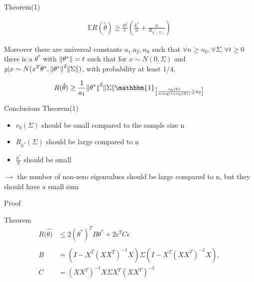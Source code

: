 \documentclass{beamer}
\begin{document}
\begin{frame}{Theorem(1)}

\begin{align*}
	\mathbb{E}R(\hat{\theta}) \geq \frac{\sigma^2}{c} \left(\frac{k^*}{n} + \frac{n}{R_{k^*(\Sigma)}}\right)
\end{align*}


Moreover there are universal constants $a_1.a_2,n_0$ such that $\forall n \geq n_0, \forall \Sigma, \forall t \geq 0$ there is a $\theta^*$ with $\norm{\theta^*} = t$ such that for $x \sim N(0,\Sigma)$ and $y|x \sim N(x^T\theta^*,\norm{\theta^*}^2\norm{\Sigma})$, with probability at least $1/4$,
	

\begin{align*}
	R(\hat{\theta})\geq \frac{1}{a_1}\norm{\theta^*}^2\norm{\Sigma}\mathbbm{1}_{\left[\frac{r_0(\Sigma)}{n\log(1+r_0(\Sigma))} \geq a_2\right]}
\end{align*}

\end{frame}

\begin{frame}{Conclusions Theorem(1)}
\begin{itemize}
\item $r_0(\Sigma)$ should be small compared to the sample size n
\item $R_{k^*}(\Sigma)$ should be large compared to n
\item $\frac{k^*}{n}$ should be small
\end{itemize}
\vspace*{0.5 cm}

$\rightarrow $ the number of non-zero eigenvalues should be large compared \hspace*{0.4 cm} to n, but they should have a small sum

\end{frame}


\begin{frame}{Proof}

\begin{center}
\begin{block}{Theorem}
	\begin{align*}
	R(\hat{\theta)} & \leq 2(\theta^*)^TB\theta^* + 2\epsilon^TC\epsilon\\\\
	B & = (I - X^T(XX^T)^{-1}X)\Sigma(I - X^T(XX^T)^{-1}X),  \\
	C & = (XX^T)^{-1}X\Sigma X^T(XX^T)^{-1}
	\end{align*}
\end{block}
\end{center}
\end{frame}
\end{document}

